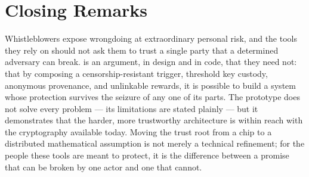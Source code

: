 \section{Closing Remarks}
\label{sec:concl-closing}

Whistleblowers expose wrongdoing at extraordinary personal risk, and the tools they
rely on should not ask them to trust a single party that a determined adversary can
break. \zkw is an argument, in design and in code, that they need not: that by
composing a censorship-resistant trigger, threshold key custody, anonymous
provenance, and unlinkable rewards, it is possible to build a system whose
protection survives the seizure of any one of its parts. The prototype does not
solve every problem --- its limitations are stated plainly --- but it demonstrates that
the harder, more trustworthy architecture is within reach with the cryptography
available today. Moving the trust root from a chip to a distributed mathematical
assumption is not merely a technical refinement; for the people these tools are
meant to protect, it is the difference between a promise that can be broken by one
actor and one that cannot.
